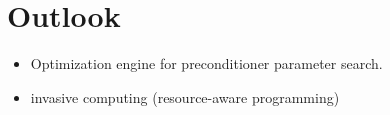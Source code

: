 \section{Outlook}
\label{subseq:part-2-outlook}

\begin{itemize}
	\item Optimization engine for preconditioner parameter search.

	
	\item invasive computing (resource-aware programming)
		
	
\end{itemize}